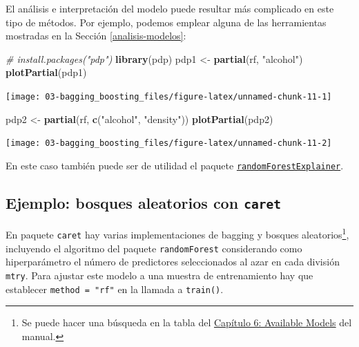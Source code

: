 \documentclass[
]{book}
\newenvironment{Shaded}{\begin{snugshade}}{\end{snugshade}}
\newcommand{\CommentTok}[1]{\textcolor[rgb]{0.56,0.35,0.01}{\textit{#1}}}
\newcommand{\KeywordTok}[1]{\textcolor[rgb]{0.13,0.29,0.53}{\textbf{#1}}}
\newcommand{\NormalTok}[1]{#1}
\newcommand{\StringTok}[1]{\textcolor[rgb]{0.31,0.60,0.02}{#1}}
\theoremstyle{break}
\theoremstyle{definition}
\theoremstyle{definition}
\theoremstyle{definition}
\theoremstyle{remark}
\begin{document}
El análisis e interpretación del modelo puede resultar más complicado en este tipo de métodos.
Por ejemplo, podemos emplear alguna de las herramientas mostradas en la Sección \ref{analisis-modelos}:

\begin{Shaded}
\begin{Highlighting}[]
\CommentTok{# install.packages("pdp")}
\KeywordTok{library}\NormalTok{(pdp)}
\NormalTok{pdp1 <-}\StringTok{ }\KeywordTok{partial}\NormalTok{(rf, }\StringTok{"alcohol"}\NormalTok{)}
\KeywordTok{plotPartial}\NormalTok{(pdp1)}
\end{Highlighting}
\end{Shaded}

\begin{center}\texttt{[image: 03-bagging\_boosting\_files/figure-latex/unnamed-chunk-11-1]} \end{center}

\begin{Shaded}
\begin{Highlighting}[]
\NormalTok{pdp2 <-}\StringTok{ }\KeywordTok{partial}\NormalTok{(rf, }\KeywordTok{c}\NormalTok{(}\StringTok{"alcohol"}\NormalTok{, }\StringTok{"density"}\NormalTok{))}
\KeywordTok{plotPartial}\NormalTok{(pdp2)}
\end{Highlighting}
\end{Shaded}

\begin{center}\texttt{[image: 03-bagging\_boosting\_files/figure-latex/unnamed-chunk-11-2]} \end{center}

En este caso también puede ser de utilidad el paquete \href{https://modeloriented.github.io/randomForestExplainer}{\texttt{randomForestExplainer}}.

\hypertarget{ejemplo-bosques-aleatorios-con-caret}{%
\subsection{\texorpdfstring{Ejemplo: bosques aleatorios con \texttt{caret}}{Ejemplo: bosques aleatorios con caret}}\label{ejemplo-bosques-aleatorios-con-caret}}

En paquete \texttt{caret} hay varias implementaciones de bagging y bosques aleatorios\footnote{Se puede hacer una búsqueda en la tabla del \href{https://topepo.github.io/caret/available-models.html}{Capítulo 6: Available Models} del manual.}, incluyendo el algoritmo del paquete \texttt{randomForest} considerando como hiperparámetro el número de predictores seleccionados al azar en cada división \texttt{mtry}.
Para ajustar este modelo a una muestra de entrenamiento hay que establecer \texttt{method\ =\ "rf"} en la llamada a \texttt{train()}.
\end{document}
